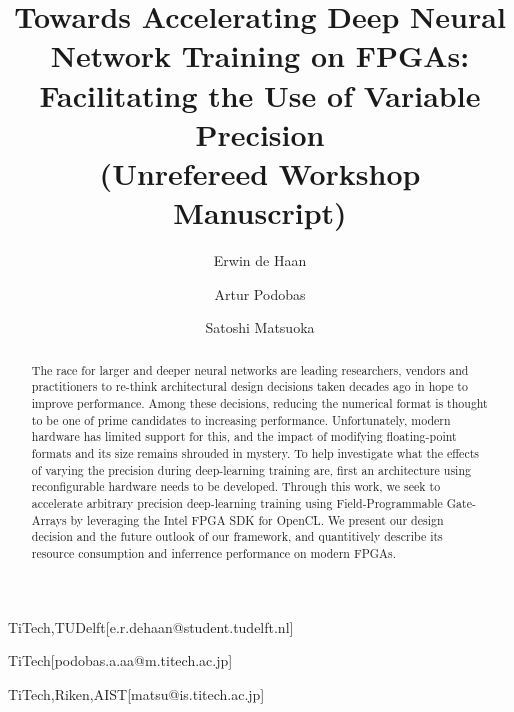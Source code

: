 \documentclass[techrep,english]{ipsj} %
\begin{document}
\title{Towards Accelerating Deep Neural Network Training on FPGAs: Facilitating the Use of Variable Precision\\ \Large{(Unrefereed Workshop Manuscript)}}


\author{Erwin de Haan}{TiTech,TUDelft}[e.r.dehaan@student.tudelft.nl]
\author{Artur Podobas}{TiTech}[podobas.a.aa@m.titech.ac.jp]
\author{Satoshi Matsuoka}{TiTech,Riken,AIST}[matsu@is.titech.ac.jp]

\begin{abstract}
The race for larger and deeper neural networks are leading researchers, vendors and practitioners to re-think architectural design decisions taken decades ago in hope to improve performance.
Among these decisions, reducing the numerical format is thought to be one of prime candidates to increasing performance.
Unfortunately, modern hardware has limited support for this, and the impact of modifying floating-point formats and its size remains shrouded in mystery.
To help investigate what the effects of varying the precision during deep-learning training are, first an architecture using reconfigurable hardware needs to be developed.
Through this work, we seek to accelerate arbitrary precision deep-learning training using Field-Programmable Gate-Arrays by leveraging the Intel FPGA SDK for OpenCL. We present our design decision and the future outlook of our framework, and quantitively describe its resource consumption and inferrence performance on modern FPGAs.
\end{abstract}


\maketitle
\end{document}
